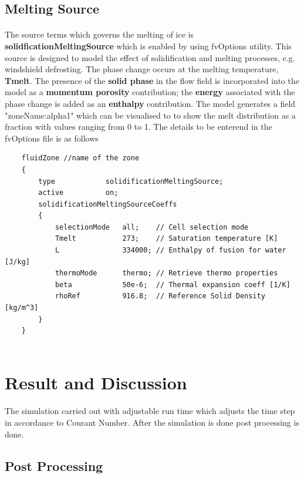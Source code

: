 \documentclass{article}
\begin{document}
    \subsection{Melting Source}
    \paragraph*{}
    The source terms which governs the melting of ice is \textbf{solidficationMeltingSource} which is enabled by using fvOptions utility. This source is designed to model the effect of solidification and melting processes, e.g. windshield defrosting.  The phase change occurs at the melting temperature, \textbf{Tmelt}. The presence of the \textbf{solid phase} in the flow field is incorporated into the model as a \textbf{momentum porosity} contribution; the \textbf{energy} associated with the phase change is added as an \textbf{enthalpy} contribution. The model generates a field "zoneName:alpha1" which can be visualised to to show the melt distribution as a fraction with values ranging from 0 to 1. The details to be enterend in the fvOptions file is as follows

    \begin{lstlisting}
    fluidZone //name of the zone
    {
        type            solidificationMeltingSource;
        active          on;
        solidificationMeltingSourceCoeffs
        {
            selectionMode   all;    // Cell selection mode 
            Tmelt           273;    // Saturation temperature [K]
            L               334000; // Enthalpy of fusion for water [J/kg]
            thermoMode      thermo; // Retrieve thermo properties 
            beta            50e-6;  // Thermal expansion coeff [1/K]
            rhoRef          916.8;  // Reference Solid Density [kg/m^3]
        }
    }
        
    \end{lstlisting}

    \section{Result and Discussion}
    \paragraph*{}
    The simulation carried out with adjustable run time which adjusts the time step in  accordance to Courant Number. After the simulation is done post processing is done. 
    
    \subsection{Post Processing}
\end{document}
